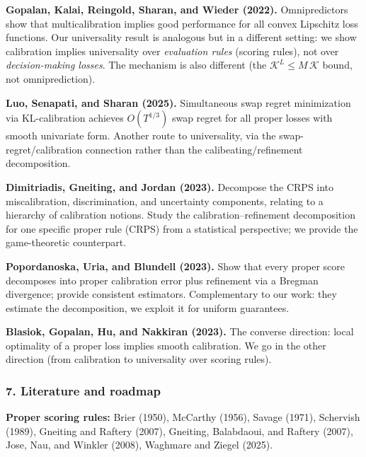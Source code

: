 \medskip\noindent\textbf{Gopalan, Kalai, Reingold, Sharan, and Wieder
(2022).}  Omnipredictors show that multicalibration implies good
performance for all convex Lipschitz loss functions.  Our universality
result is analogous but in a different setting: we show calibration
implies universality over \emph{evaluation rules} (scoring rules), not
over \emph{decision-making losses}.  The mechanism is also different
(the $\mathcal{K}^{L} \leq M\,\mathcal{K}$ bound, not
omniprediction).

\medskip\noindent\textbf{Luo, Senapati, and Sharan (2025).}
Simultaneous swap regret minimization via KL-calibration achieves
$O(T^{1/3})$ swap regret for all proper losses with smooth univariate
form.  Another route to universality, via the swap-regret/calibration
connection rather than the calibeating/refinement decomposition.

\medskip\noindent\textbf{Dimitriadis, Gneiting, and Jordan (2023).}
Decompose the CRPS into miscalibration, discrimination, and uncertainty
components, relating to a hierarchy of calibration notions.  Study the
calibration--refinement decomposition for one specific proper rule (CRPS)
from a statistical perspective; we provide the game-theoretic counterpart.

\medskip\noindent\textbf{Popordanoska, Uria, and Blundell (2023).}
Show that every proper score decomposes into proper calibration error plus
refinement via a Bregman divergence; provide consistent estimators.
Complementary to our work: they estimate the decomposition, we exploit
it for uniform guarantees.

\medskip\noindent\textbf{Blasiok, Gopalan, Hu, and Nakkiran (2023).}
The converse direction: local optimality of a proper loss implies smooth
calibration.  We go in the other direction (from calibration to
universality over scoring rules).



\subsubsection*{7. Literature and roadmap}

\noindent\textbf{Proper scoring rules:}
Brier (1950),
McCarthy (1956),
Savage (1971),
Schervish (1989),
Gneiting and Raftery (2007),
Gneiting, Balabdaoui, and Raftery (2007),
Jose, Nau, and Winkler (2008),
Waghmare and Ziegel (2025).

